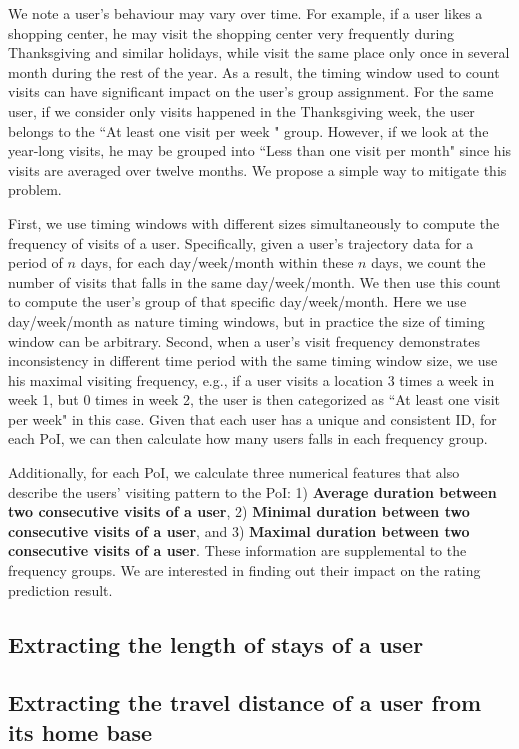 We note a user's behaviour may vary over time. For example, if a user likes a shopping center, he may visit the shopping center very frequently during Thanksgiving and similar holidays, while visit the same place only once in several month during the rest of the year. As a result, the timing window used to count visits can have significant impact on the user's group assignment. For the same user, if we consider only visits happened in the Thanksgiving week, the user belongs to the ``At least one visit per week " group. However, if we look at the year-long visits, he may be grouped into ``Less than one visit per month" since his visits are averaged over twelve months. We propose a simple way to mitigate this problem.

First, we use timing windows with different sizes simultaneously to compute the frequency of visits of a user. Specifically, given a user's trajectory data for a period of $n$ days, for each day/week/month within these $n$ days, we count the number of visits that falls in the same day/week/month. We then use this count to compute the user's group of that specific day/week/month. Here we use day/week/month as nature timing windows, but in practice the size of timing window can be arbitrary. Second, when a user's visit frequency demonstrates inconsistency in different time period with the same timing window size, we use his maximal visiting frequency, e.g., if a user visits a location 3 times a week in week 1, but 0 times in week 2, the user is then categorized as ``At least one visit per week" in this case. Given that each user has a unique and consistent ID, for each PoI, we can then calculate how many users falls in each frequency group.

Additionally, for each PoI, we calculate three numerical features that also describe the users' visiting pattern to the PoI: 1) \textbf{Average duration between two consecutive visits of a user}, 2) \textbf{Minimal duration between two consecutive visits of a user}, and 3) \textbf{Maximal duration between two consecutive visits of a user}. These information are supplemental to the frequency groups. We are interested in finding out their impact on the rating prediction result.

\subsection{Extracting the length of stays of a user}




\subsection{Extracting the travel distance of a user from its home base}

